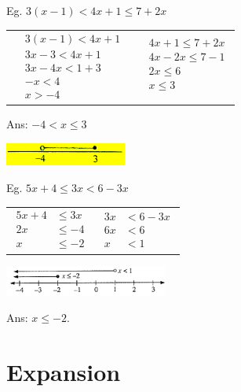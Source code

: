 \documentclass[twocolumn]{article}
\begin{document}
\bigskip 

\noindent 
Eg. $3(x-1)<4 x+1 \leq 7+2 x$

\bigskip 
\begin{tabular}{c|c} 
	$
	\begin{aligned}
		& 3(x-1)<4 x+1 \\
		& 3 x-3<4 x+1 \\
		& 3 x-4 x<1+3 \\
		& -x<4 \\
		& x>-4
	\end{aligned}
	$
	& 
	$
	\begin{aligned}
		& 4 x+1 \leq 7+2 x \\
		& 4 x-2 x \leq 7-1 \\
		& 2 x \leq 6 \\
		& x \leq 3 \\
		& ~
	\end{aligned}
	$
\end{tabular} 

\bigskip 

\noindent 
Ans: $-4 < x \leq 3$

\includegraphics[width=0.3\textwidth]{03.png}

\bigskip 

\noindent 
Eg. $5 x+4 \leq 3 x<6-3 x$

\bigskip 
\begin{tabular}{c|c} 
	$
	\begin{aligned}
		5 x+4 & \leq 3 x \\
		2 x & \leq-4\\
		x & \leq-2
	\end{aligned}
	$
	& 
	$
	\begin{aligned}
		3 x & <6-3 x \\
		6 x & <6 \\
		x & <1
	\end{aligned}
	$
\end{tabular} 

\bigskip 

\includegraphics[width=0.4\textwidth]{04.png}

\noindent 
Ans: $x \leq -2$.

\section*{Expansion}
\end{document}
